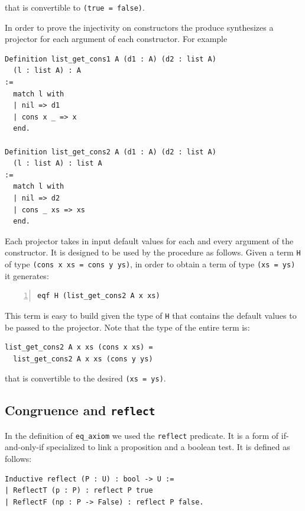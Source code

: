 \documentclass[sigplan,10pt,review]{acmart}\settopmatter{printfolios=true,printccs=false,printacmref=false}
\newcommand{\derive}[1]{\keys{#1}}
\begin{document}
\noindent
that is convertible to \lstinline+(true = false)+.

In order to prove the injectivity on constructors the \derive{projK}
produce synthesizes a projector for each argument of each constructor.
For example

\begin{lstlisting}
Definition list_get_cons1 A (d1 : A) (d2 : list A)
  (l : list A) : A
:=
  match l with
  | nil => d1
  | cons x _ => x
  end.

Definition list_get_cons2 A (d1 : A) (d2 : list A)
  (l : list A) : list A
:=
  match l with
  | nil => d2
  | cons _ xs => xs
  end.
\end{lstlisting}

\noindent
Each projector takes in input default values for each and every
argument of the constructor. It is designed to be used by the
\derive{injection} procedure as follows. Given a term
\lstinline+H+ of type \lstinline+(cons x xs = cons y ys)+, in order
to obtain a term of type \lstinline+(xs = ys)+ it generates:

\begin{lstlisting}[numbers=left]
eqf H (list_get_cons2 A x xs)
\end{lstlisting}

\noindent
This term is easy to build given the type of \lstinline+H+ that
contains the default values to be passed to the projector.
Note that the type of the entire term is:

\begin{lstlisting}
list_get_cons2 A x xs (cons x xs) =
  list_get_cons2 A x xs (cons y ys)
\end{lstlisting}

\noindent
that is convertible to the desired \lstinline+(xs = ys)+.

\subsection{Congruence and \lstinline+reflect+} %
\label{sec:reflect}

In the definition of \lstinline+eq_axiom+ we used the \lstinline+reflect+
predicate. It is a form of if-and-only-if specialized to link a
proposition and a boolean test. It is defined as follows:

\begin{lstlisting}
Inductive reflect (P : U) : bool -> U :=
| ReflectT (p : P) : reflect P true
| ReflectF (np : P -> False) : reflect P false.
\end{lstlisting}
\end{document}
